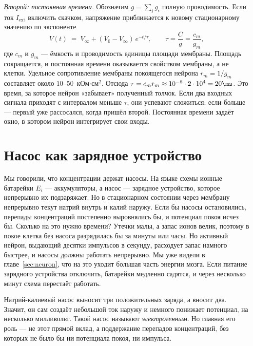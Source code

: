 \emph{Второй: постоянная времени.} Обозначим $g=\sum_i g_i$ полную проводимость. Если ток $I_{\text{ext}}$ включить скачком, напряжение приближается к новому стационарному значению по экспоненте
\begin{equation}
V(t) \;=\; V_\infty + (V_0-V_\infty)\,e^{-t/\tau}, \qquad \tau = \frac{C}{g} = \frac{c_m}{g_m} ,
\label{eq:tau}
\end{equation}
где $c_m$ и $g_m$ --- ёмкость и проводимость единицы площади мембраны. Площадь сокращается, и постоянная времени оказывается свойством мембраны, а не клетки. Удельное сопротивление мембраны покоящегося нейрона $r_m=1/g_m$ составляет около $10$--$50$~кОм$\cdot$см$^2$. Отсюда $\tau=c_mr_m\approx10^{-6}\cdot2\cdot10^4=20\ms$. Это время, за которое нейрон «забывает» полученный толчок. Если два входных сигнала приходят с интервалом меньше $\tau$, они успевают сложиться; если больше --- первый уже рассосался, когда пришёл второй. Постоянная времени задаёт окно, в котором нейрон интегрирует свои входы.

\section{Насос как зарядное устройство}

Мы говорили, что концентрации держат насосы. На языке схемы ионные батарейки $E_i$ --- аккумуляторы, а насос --- зарядное устройство, которое непрерывно их подзаряжает. Но в стационарном состоянии через мембрану непрерывно текут натрий внутрь и калий наружу. Если бы насосы остановились, перепады концентраций постепенно выровнялись бы, и потенциал покоя исчез бы. Сколько на это нужно времени? Утечки малы, а запас ионов велик, поэтому в покое клетка без насоса разрядилась бы за минуты или часы. Но активный нейрон, выдающий десятки импульсов в секунду, расходует запас намного быстрее, и насосы должны работать непрерывно. Мы уже видели в главе~\ref{sec:neuron}, что на это уходит большая часть энергии мозга. Если питание зарядного устройства отключить, батарейки медленно садятся, и через несколько минут схема перестаёт работать.

Натрий-калиевый насос выносит три положительных заряда, а вносит два. Значит, он сам создаёт небольшой ток наружу и немного понижает потенциал, на несколько милливольт. Такой насос называют \emph{электрогенным}. Но главная его роль --- не этот прямой вклад, а поддержание перепадов концентраций, без которых не было бы ни потенциала покоя, ни импульса.
